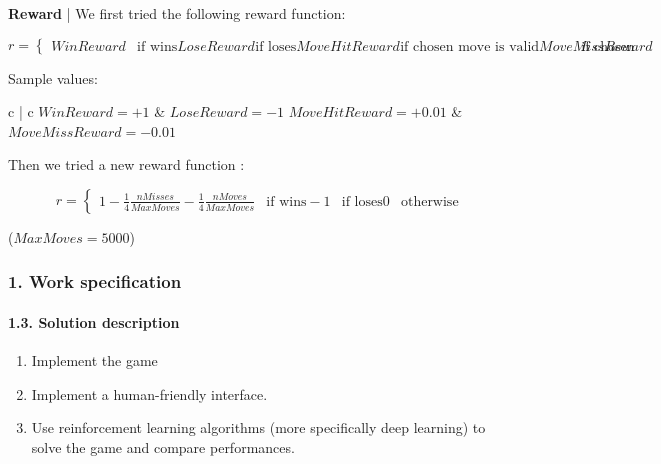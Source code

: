 \documentclass{beamer}
\def\\{}
\begin{document}
\begin{frame}

\textbf{Reward} | We first tried the following reward function:

\begin{equation*}
  r = \begin{cases}
    WinReward & \text{if wins} \\
    LoseReward & \text{if loses} \\
    MoveHitReward & \text{if chosen move is valid} \\
    MoveMissReward & \text{if chosen move is invalid}
  \end{cases}
\end{equation*}

Sample values:
\begin{center}
  \footnotesize
  \begin{tabular}{c | c}
    $WinReward = +1$ & $LoseReward=-1$ \\ \hline
    $MoveHitReward = +0.01$ & $MoveMissReward = -0.01$
  \end{tabular}
\end{center}

Then we tried a new reward function \cite{metz2020}:

\begin{equation*}
  r = \begin{cases}
    1 - \frac{1}{4}\frac{nMisses}{MaxMoves} - \frac{1}{4} \frac{nMoves}{MaxMoves} & \text{if wins} \\
    -1 & \text{if loses} \\
    0 & \text{otherwise}
  \end{cases}
\end{equation*}

($MaxMoves = 5000$)

\end{frame}

\begin{frame}
\frametitle{1. Work specification}
\framesubtitle{1.3. Solution description}

\begin{enumerate}
  \itemsep0em
  \item Implement the game
  \item Implement a human-friendly interface.
  \item Use reinforcement learning algorithms (more specifically deep learning) to solve the game and compare performances.
\end{enumerate}

\end{frame}
\end{document}
